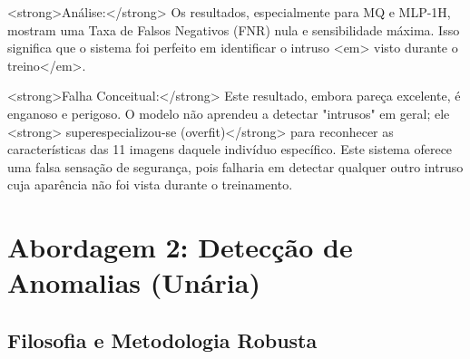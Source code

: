 \documentclass[a4paper,12pt]{article}
\begin{document}
\begin{itemize}
\begin{table}[h!]
\centering
\caption{A8 — Métricas de controle de acesso (classificação binária): média <strong> </strong> desvio padrão.}
\label{tab:a8_binario}
\end{table}

\noindent<strong>Análise:</strong> Os resultados, especialmente para MQ e MLP-1H, mostram uma Taxa de Falsos Negativos (FNR) nula e sensibilidade máxima. Isso significa que o sistema foi perfeito em identificar o intruso <em> visto durante o treino</em>.

<strong>Falha Conceitual:</strong> Este resultado, embora pareça excelente, é enganoso e perigoso. O modelo não aprendeu a detectar "intrusos" em geral; ele <strong> superespecializou-se (overfit)</strong> para reconhecer as características das 11 imagens daquele indivíduo específico. Este sistema oferece uma falsa sensação de segurança, pois falharia em detectar qualquer outro intruso cuja aparência não foi vista durante o treinamento.

\section{Abordagem 2: Detecção de Anomalias (Unária)}

\subsection{Filosofia e Metodologia Robusta}


\end{itemize}
\end{document}
